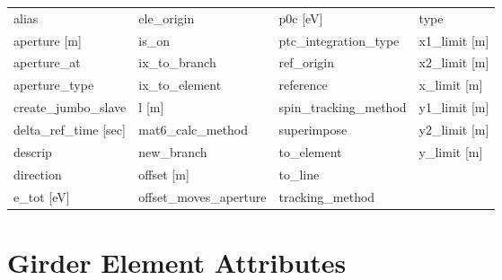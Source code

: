  \begin{tabular}{llll} \toprule
alias                          & ele_origin                     & p0c [eV]                       & type                           \\
aperture [m]                   & is_on                          & ptc_integration_type           & x1_limit [m]                   \\
aperture_at                    & ix_to_branch                   & ref_origin                     & x2_limit [m]                   \\
aperture_type                  & ix_to_element                  & reference                      & x_limit [m]                    \\
create_jumbo_slave             & l [m]                          & spin_tracking_method           & y1_limit [m]                   \\
delta_ref_time [sec]           & mat6_calc_method               & superimpose                    & y2_limit [m]                   \\
descrip                        & new_branch                     & to_element                     & y_limit [m]                    \\
direction                      & offset [m]                     & to_line                        &                                \\
e_tot [eV]                     & offset_moves_aperture          & tracking_method                &                                \\
 \bottomrule
 \end{tabular}
 \vfill
 
 \section{Girder Element Attributes}
 \label{s:list.girder}
 
